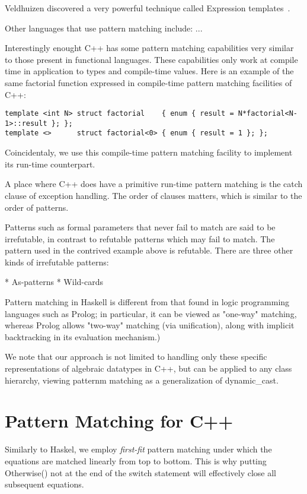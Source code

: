 \documentclass[submission,copyright]{eptcs}
\begin{document}
Veldhuizen discovered a very powerful technique called Expression 
templates~\cite{Veldhuizen95expressiontemplates}.

Other languages that use pattern matching include: ...

Interestingly enought C++ has some pattern matching capabilities very similar to 
those present in functional languages. These capabilities only work at compile 
time in application to types and compile-time values. Here is an example of the 
same factorial function expressed in compile-time pattern matching facilities of 
C++:

\begin{lstlisting}
template <int N> struct factorial    { enum { result = N*factorial<N-1>::result }; };
template <>      struct factorial<0> { enum { result = 1 }; };
\end{lstlisting}

Coincidentaly, we use this compile-time pattern matching facility to implement 
its run-time counterpart.

A place where C++ does have a primitive run-time pattern matching is the catch 
clause of exception handling. The order of clauses matters, which is similar to 
the order of patterns. 

Patterns such as formal parameters that never fail to match are said to be 
irrefutable, in contrast to refutable patterns which may fail to match. The 
pattern used in the contrived example above is refutable. There are three other 
kinds of irrefutable patterns:

* As-patterns
* Wild-cards 

Pattern matching in Haskell is different from that found in logic programming 
languages such as Prolog; in particular, it can be viewed as "one-way" matching, 
whereas Prolog allows "two-way" matching (via unification), along with implicit 
backtracking in its evaluation mechanism.) 

We note that our approach is not limited to handling only these specific 
representations of algebraic datatypes in C++, but can be applied to any class 
hierarchy, viewing patternm matching as a generalization of 
dynamic\_cast.

\section{Pattern Matching for C++} %
\label{sec:pm}

Similarly to Haskel, we employ \emph{first-fit} pattern matching under which the 
equations are matched linearly from top to bottom. This is why putting 
Otherwise() not at the end of the switch statement will effectively close all 
subsequent equations.
\end{document}
